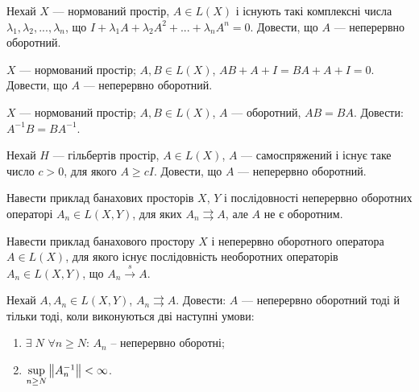 \begin{exercise}
    Нехай $X$ --- нормований простір, $A \in L(X)$ і існують такі комплексні числа
    $\lambda_1, \lambda_2, ..., \lambda_n$, що $I + \lambda_1 A + \lambda_2 A^2
    + ... + \lambda_n A^n = 0$. Довести, що $A$ --- неперервно оборотний.
\end{exercise}

\begin{exercise}
    $X$ --- нормований простір; $A, B \in L(X)$, $AB+A+I=BA+A+I=0$.
    Довести, що $A$ --- неперервно оборотний.
\end{exercise}

\begin{exercise}
    $X$ --- нормований простір; $A, B \in L(X)$, $A$ --- оборотний, $AB=BA$.
    Довести: $A^{-1}B = BA^{-1}$.
\end{exercise}

\begin{exercise}
    Нехай $H$ --- гільбертів простір, $A \in L(X)$, $A$ --- самоспряжений
    і існує таке число $c > 0$, для якого $A \geq cI$.
    Довести, що $A$ --- неперервно оборотний.
\end{exercise}

\begin{exercise}
    Навести приклад банахових просторів $X$, $Y$ і послідовності неперервно
    оборотних операторі $A_n \in L(X,Y)$, для яких $A_n \rightrightarrows A$,
    але $A$ не є оборотним.
\end{exercise}

\begin{exercise}
    Навести приклад банахового простору $X$ і неперервно оборотного оператора
    $A \in L(X)$, для якого існує послідовність необоротних операторів
     $A_n \in L(X,Y)$, що $A_n \overset{s}{\to} A$.
\end{exercise}

\begin{exercise}\label{N:1_6_36}
    Нехай $A, A_n \in L(X, Y)$, $A_n \rightrightarrows A$.
    Довести: $A$ --- неперервно оборотний тоді й тільки тоді, коли
    виконуються дві наступні умови:
    \begin{enumerate}
        \item $\exists \; N$ $\forall n \geq N$: $A_n$ -- неперервно оборотні;
        \item $\underset{n \geq N}{\sup} \left\lVert A_n^{-1}\right\rVert < \infty$.
    \end{enumerate}
\end{exercise}